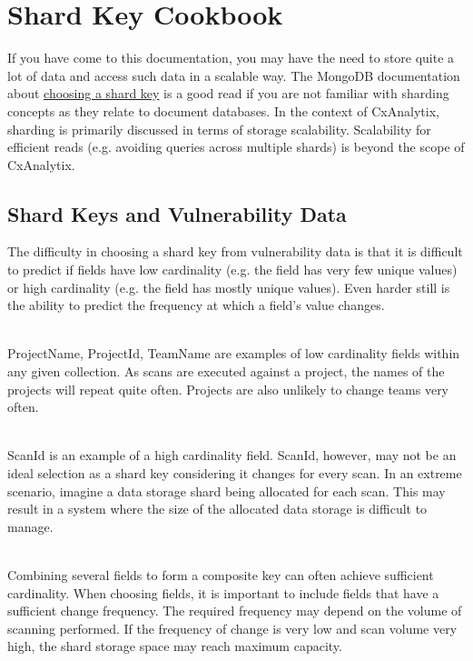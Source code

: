 \chapter{Shard Key Cookbook}\label{ShardKeyCookbook}


If you have come to this documentation, you may have the need to store quite a lot of data and access such data in a scalable way.  
The MongoDB documentation about \href{https://docs.mongodb.com/manual/core/sharding-shard-key/#choosing-a-shard-key}{choosing a shard key} is a good read if you are
not familiar with sharding concepts as they relate to document databases.  In the context of CxAnalytix, sharding is primarily discussed in terms of 
storage scalability.  Scalability for efficient reads (e.g. avoiding queries across multiple shards) is beyond the scope of CxAnalytix.


\section{Shard Keys and Vulnerability Data}

The difficulty in choosing a shard key from vulnerability data is that it is difficult to predict if fields have low cardinality 
(e.g. the field has very few unique values) or high cardinality (e.g. the field has mostly unique values).  Even harder still is the ability to predict
the frequency at which a field's value changes.

\noindent\\ProjectName, ProjectId, TeamName are examples of low cardinality fields within any given collection.  As scans are executed against a project, 
the names of the projects will repeat quite often.  Projects are also unlikely to change teams very often.

\noindent\\ScanId is an example of a high cardinality field.  ScanId, however, may not be an ideal selection as a shard key considering it changes
for every scan.  In an extreme scenario, imagine a data storage shard being allocated for each scan.  This may result in a system where the size of
the allocated data storage is difficult to manage.

\noindent\\Combining several fields to form a composite key can often achieve sufficient cardinality.  When choosing fields, it is important to include
fields that have a sufficient change frequency.  The required frequency may depend on the volume of scanning performed.  If the frequency of change is 
very low and scan volume very high, the shard storage space may reach maximum capacity.


